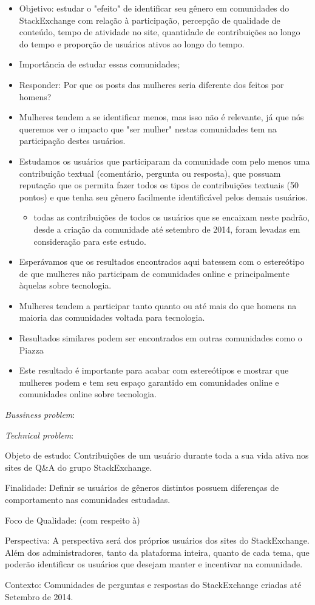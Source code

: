 \begin{itemize}
	\item Objetivo: estudar o "efeito" de identificar seu gênero em comunidades do StackExchange com relação à participação, percepção de qualidade de conteúdo, tempo de atividade no site, quantidade de contribuições ao longo do tempo e proporção de usuários ativos ao longo do tempo.
	\item Importância de estudar essas comunidades;
	\item Responder: Por que os posts das mulheres seria diferente dos feitos por homens?
	\item Mulheres tendem a se identificar menos, mas isso não é relevante, já que nós queremos ver o impacto que "ser mulher" nestas comunidades tem na participação destes usuários.
	\item Estudamos os usuários que participaram da comunidade com pelo menos uma contribuição textual (comentário, pergunta ou resposta), que possuam reputação que os permita fazer todos os tipos de contribuições textuais (50 pontos) e que tenha seu gênero facilmente identificável pelos demais usuários.
	\begin{itemize}
		\item todas as contribuições de todos os usuários que se encaixam neste padrão, desde a criação da comunidade até setembro de 2014, foram levadas em consideração para este estudo.
	\end{itemize}
	\item Esperávamos que os resultados encontrados aqui batessem com o estereótipo de que mulheres não participam de comunidades online e principalmente àquelas sobre tecnologia.
	\item Mulheres tendem a participar tanto quanto ou até mais do que homens na maioria das comunidades voltada para tecnologia. 
	\item Resultados similares podem ser encontrados em outras comunidades como o Piazza\cite{piazza:report}
	\item Este resultado é importante para acabar com estereótipos e mostrar que mulheres podem e tem seu espaço garantido em comunidades online e comunidades online sobre tecnologia.
\end{itemize}

\emph{Bussiness problem}: 

\emph{Technical problem}: 

Objeto de estudo: Contribuições de um usuário durante toda a sua vida ativa nos sites de Q\&A do grupo StackExchange.

Finalidade: Definir se usuários de gêneros distintos possuem diferenças de comportamento nas comunidades estudadas.

Foco de Qualidade: (com respeito à)

Perspectiva: A perspectiva será dos próprios usuários dos sites do StackExchange. Além dos administradores, tanto da plataforma inteira, quanto de cada tema, que poderão identificar os usuários que desejam manter e incentivar na comunidade.

Contexto: Comunidades de perguntas e respostas do StackExchange criadas até Setembro de 2014.